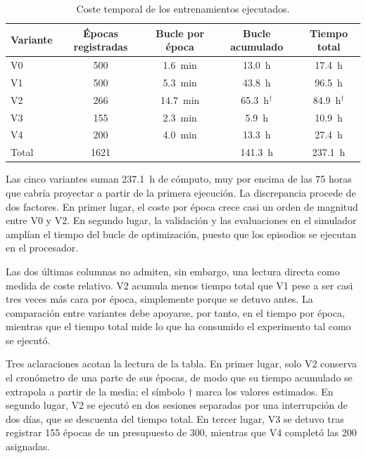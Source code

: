 \begin{table}[htbp]
  \centering
  \caption{Coste temporal de los entrenamientos ejecutados.}
  \label{tab:coste}
  \small
  \begin{tabular}{lcccc}
    \toprule
    Variante & \'Epocas registradas & Bucle por \'epoca & Bucle acumulado & Tiempo total \\
    \midrule
    V0 & \num{500} & \SI{1.6}{\minute}  & \SI{13.0}{\hour}             & \SI{17.4}{\hour} \\
    V1 & \num{500} & \SI{5.3}{\minute}  & \SI{43.8}{\hour}             & \SI{96.5}{\hour} \\
    V2 & \num{266} & \SI{14.7}{\minute} & \SI{65.3}{\hour}$^{\dagger}$ & \SI{84.9}{\hour}$^{\dagger}$ \\
    V3 & \num{155} & \SI{2.3}{\minute}  & \SI{5.9}{\hour}              & \SI{10.9}{\hour} \\
    V4 & \num{200} & \SI{4.0}{\minute}  & \SI{13.3}{\hour}             & \SI{27.4}{\hour} \\
    \midrule
    Total & \num{1621} & & \SI{141.3}{\hour} & \SI{237.1}{\hour} \\
    \bottomrule
  \end{tabular}
\end{table}

Las cinco variantes suman \SI{237.1}{\hour} de c\'omputo, muy por encima de las \num{75}
horas que cabr\'ia proyectar a partir de la primera ejecuci\'on. La discrepancia procede de
dos factores. En primer lugar, el coste por \'epoca crece casi un orden de magnitud entre
V0 y V2. En segundo lugar, la validaci\'on y las evaluaciones en el simulador ampl\'ian el
tiempo del bucle de optimizaci\'on, puesto que los episodios se ejecutan en el procesador.

Las dos \'ultimas columnas no admiten, sin embargo, una lectura directa como medida de
coste relativo. V2 acumula menos tiempo total que V1 pese a ser casi tres veces m\'as cara
por \'epoca, simplemente porque se detuvo antes. La comparaci\'on entre variantes debe
apoyarse, por tanto, en el tiempo por \'epoca, mientras que el tiempo total mide lo que ha
consumido el experimento tal como se ejecut\'o.

Tres aclaraciones acotan la lectura de la tabla. En primer lugar, solo V2 conserva el
cron\'ometro de una parte de sus \'epocas, de modo que su tiempo acumulado se extrapola a
partir de la media; el s\'imbolo $\dagger$ marca los valores estimados. En segundo lugar,
V2 se ejecut\'o en dos sesiones separadas por una interrupci\'on de dos d\'ias, que se
descuenta del tiempo total. En tercer lugar, V3 se detuvo tras registrar \num{155} \'epocas
de un presupuesto de \num{300}, mientras que V4 complet\'o las \num{200} asignadas.

